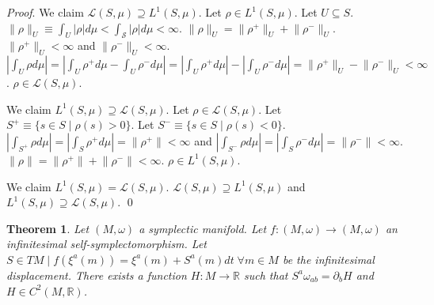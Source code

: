 \documentclass[smallextended]{svjour3}
\numberwithin{equation}{section}
\renewenvironment{proof}{\emph{Proof}.}{\hfill\(\qed\)}
\newtheorem{thrm}[equation]{Theorem}
\theoremstyle{definition}
\renewenvironment{proof}{\emph{Proof}.}{\qed}
\begin{document}
\begin{proof}
	We claim $\mathcal{L}(S,\mu) \supseteq L^1(S,\mu)$. Let $\rho \in L^1(S,\mu)$. Let $U \subseteq S$. $\lVert \rho \rVert_U \equiv \int_{U} |\rho| d\mu < \int_{\mathcal{S}} |\rho| d\mu < \infty$. $\lVert \rho \rVert_U = \lVert \rho^+ \rVert_U + \lVert \rho^- \rVert_U$. $\lVert \rho^+ \rVert_U < \infty$ and $\lVert \rho^- \rVert_U < \infty$. $|\int_{U} \rho d\mu| = |\int_{U} \rho^+ d\mu - \int_{U} \rho^- d\mu| = |\int_{U} \rho^+ d\mu| - |\int_{U} \rho^- d\mu| = \lVert \rho^+ \rVert_U - \lVert \rho^- \rVert_U < \infty$. $\rho \in\mathcal{L}(S,\mu)$.
	
	We claim $L^1(S,\mu) \supseteq \mathcal{L}(S,\mu)$.  Let $\rho \in \mathcal{L}(S,\mu)$. Let $S^+ \equiv  \{ s \in S \; | \; \rho(s) > 0\}$. Let $S^- \equiv  \{ s \in S \; | \; \rho(s) < 0\}$. $|\int_{S^+} \rho d\mu| = |\int_{S} \rho^+ d\mu| = \lVert \rho^+ \rVert < \infty$ and $|\int_{S^-} \rho d\mu| = |\int_{S} \rho^- d\mu| = \lVert \rho^- \rVert < \infty$. $\lVert \rho \rVert = \lVert \rho^+ \rVert + \lVert \rho^- \rVert < \infty$. $\rho \in L^1(S,\mu)$.
	
	We claim $L^1(S,\mu) = \mathcal{L}(S,\mu)$. $\mathcal{L}(S,\mu) \supseteq L^1(S,\mu)$ and $L^1(S,\mu) \supseteq \mathcal{L}(S,\mu)$.	
\end{proof}

\begin{thrm}\label{symplectomorphism_generator}
	Let $(M, \omega)$ a symplectic manifold. Let $f: (M, \omega) \rightarrow (M, \omega)$ an infinitesimal self-symplectomorphism. Let $S \in TM \; | \; f(\xi^a(m)) = \xi^a(m) + S^a(m)dt \; \forall m \in M$ be the infinitesimal displacement. There exists a function $H: M \rightarrow \mathbb{R}$ such that $S^{a} \omega_{ab} = \partial_{b}H$ and $H \in C^2(M, \mathbb{R})$.
\end{thrm}
\end{document}
